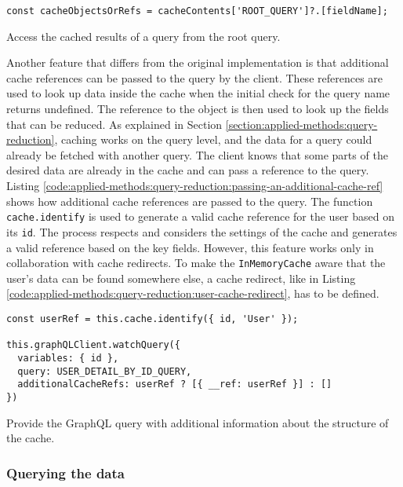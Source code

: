 \ifshowListings
\begin{listing}[H]
\begin{verbatim}
const cacheObjectsOrRefs = cacheContents['ROOT_QUERY']?.[fieldName];
\end{verbatim}
\caption{Access the cached results of a query from the root query.}\label{code:applied-methods:query-reduction:getting-cache-content}
\end{listing}
\fi

\noindent Another feature that differs from the original implementation is that additional cache references can be passed to the query by the client. These references are used to look up data inside the cache when the initial check for the query name returns undefined. The reference to the object is then used to look up the fields that can be reduced. As explained in Section \ref{section:applied-methods:query-reduction}, caching works on the query level, and the data for a query could already be fetched with another query. The client knows that some parts of the desired data are already in the cache and can pass a reference to the query. Listing \ref{code:applied-methods:query-reduction:passing-an-additional-cache-ref} shows how additional cache references are passed to the query. The function \texttt{cache.identify} is used to generate a valid cache reference for the user based on its \texttt{id}. The process respects and considers the settings of the cache and generates a valid reference based on the key fields. However, this feature works only in collaboration with cache redirects. To make the \texttt{InMemoryCache} aware that the user's data can be found somewhere else, a cache redirect, like in Listing \ref{code:applied-methods:query-reduction:user-cache-redirect}, has to be defined.

\ifshowListings
\begin{listing}[H]
\begin{verbatim}
const userRef = this.cache.identify({ id, 'User' });

this.graphQLClient.watchQuery({
  variables: { id },
  query: USER_DETAIL_BY_ID_QUERY,
  additionalCacheRefs: userRef ? [{ __ref: userRef }] : []
})
\end{verbatim}
\caption{Provide the GraphQL query with additional information about the structure of the cache.}\label{code:applied-methods:query-reduction:passing-an-additional-cache-ref}
\end{listing}
\fi

\subsubsection{Querying the data}

